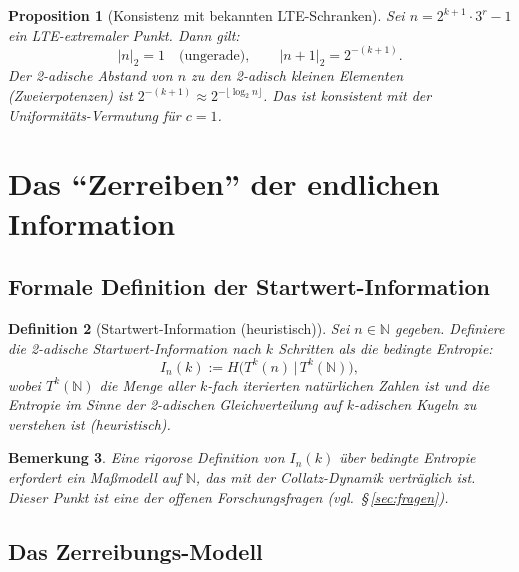 \documentclass[12pt,a4paper]{article}
\newtheorem{definition}{Definition}[section]
\newtheorem{proposition}[definition]{Proposition}
\newtheorem{bemerkung}[definition]{Bemerkung}
\newcommand{\N}{\mathbb{N}}
\begin{document}
\begin{proposition}[Konsistenz mit bekannten LTE-Schranken]
\label{prop:konsistenz}
Sei $n = 2^{k+1} \cdot 3^r - 1$ ein LTE-extremaler Punkt. Dann gilt:
\[
  |n|_2 = 1
  \quad \text{(ungerade)}, \qquad
  |n+1|_2 = 2^{-(k+1)}.
\]
Der 2-adische Abstand von $n$ zu den 2-adisch kleinen Elementen
(Zweierpotenzen) ist $2^{-(k+1)} \approx 2^{-\lfloor\log_2 n\rfloor}$.
Das ist konsistent mit der Uniformitäts-Vermutung für $c = 1$.
\end{proposition}

\section{Das ``Zerreiben'' der endlichen Information}
\label{sec:zerreiben}

\subsection{Formale Definition der Startwert-Information}

\begin{definition}[Startwert-Information (heuristisch)]
\label{def:info}
Sei $n \in \N$ gegeben. Definiere die \emph{2-adische Startwert-Information}
nach $k$ Schritten als die bedingte Entropie:
\[
  I_n(k) := H\bigl(T^k(n) \,\big|\, T^k(\N)\bigr),
\]
wobei $T^k(\N)$ die Menge aller $k$-fach iterierten natürlichen Zahlen ist
und die Entropie im Sinne der 2-adischen Gleichverteilung auf
$k$-adischen Kugeln zu verstehen ist (heuristisch).
\end{definition}

\begin{bemerkung}
Eine rigorose Definition von $I_n(k)$ über bedingte Entropie erfordert
ein Maßmodell auf $\N$, das mit der Collatz-Dynamik verträglich ist.
Dieser Punkt ist eine der offenen Forschungsfragen (vgl.\ \S\,\ref{sec:fragen}).
\end{bemerkung}

\subsection{Das Zerreibungs-Modell}
\end{document}
